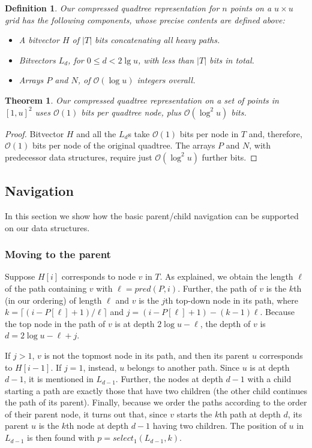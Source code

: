 \documentclass{elsarticle}
\newtheorem{theorem}{Theorem}
\newtheorem{definition}{Definition}
\newcommand{\Oh}[1]
  {\ensuremath{\mathcal{O}\!\left( {#1} \right)}}
\begin{document}
\begin{definition}
Our compressed quadtree representation for $n$ points on a $u \times u$ grid 
has the following components, whose precise contents are defined above:
\begin{itemize}
\item A bitvector $H$ of $|T|$ bits concatenating all heavy paths.
\item Bitvectors $L_d$, for $0 \le d < 2\lg u$, with less than $|T|$ bits in total.
\item Arrays $P$ and $N$, of $\Oh{\log u}$ integers overall.
\end{itemize}
\end{definition}

\begin{theorem}
Our compressed quadtree representation on a set of points in $[1,u]^2$ uses $\Oh{1}$ bits per quadtree node, plus $\Oh{\log^2 u}$ bits.
\end{theorem}
\begin{proof}
Bitvector $H$ and all the $L_d$s take $\Oh{1}$ bits per node in $T$ and, therefore, $\Oh{1}$ bits per node of the original quadtree. The arrays $P$ and $N$, with predecessor data structures, require just $\Oh{\log^2 u}$ further bits.
\end{proof}

\subsection{Navigation}
\label{sec:nav}

In this section we show how the basic parent/child navigation can be supported on our data structures.

\subsubsection{Moving to the parent}
Suppose \(H [i]\) corresponds to node $v$ in $T$. As explained, we obtain the length $\ell$ of the path containing $v$ with $\ell = pred(P,i)$. Further, the path of $v$ is the $k$th (in our ordering) of length $\ell$ and $v$ is the $j$th top-down node in its path, where $k=\lceil (i-P[\ell]+1)/\ell\rceil$ and $j=(i-P[\ell]+1)-(k-1)\ell$. Because the top node in the path of $v$ is at depth $2\log u - \ell$, the depth of $v$ is $d = 2\log u - \ell + j$.

If $j>1$, $v$ is not the topmost node in its path, and then its parent $u$ corresponds to $H[i-1]$. If $j=1$, instead, $u$ belongs to another path. Since $u$ is at depth $d-1$, it is mentioned in $L_{d-1}$. Further, the nodes at depth $d-1$ with a child starting a path are exactly those that have two children (the other child continues the path of its parent). Finally, because we order the paths according to the order of their parent node, it turns out that, since $v$ starts the $k$th path at depth $d$, its parent $u$ is the $k$th node at depth $d-1$ having two children. The position of $u$ in $L_{d-1}$ is then found with $p = select_1(L_{d-1},k)$. 
\end{document}
